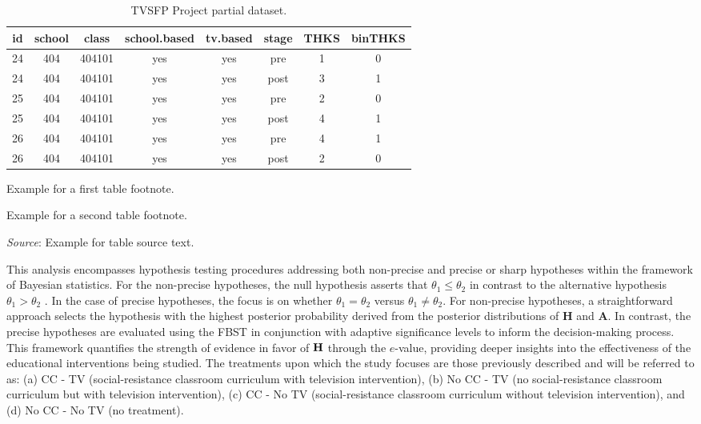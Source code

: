 \documentclass[AMA,Times1COL]{WileyNJDv5} %
\begin{document}
\begin{table}[!h]%
\centering %
\caption{TVSFP Project partial dataset.}\label{tab1}%
\begin{tabular*}{\textwidth}{@{\extracolsep\fill}cccccccc@{\extracolsep\fill}}
\toprule
\textbf{id}	&	\textbf{school}	&	\textbf{class}	&	\textbf{school.based}	&	\textbf{tv.based}	&	\textbf{stage}	&	\textbf{THKS}	&	\textbf{binTHKS}
\\ 
\midrule
24	&	404	&	404101	&	yes	&	yes	&	pre	&	1	&	0\\
24	&	404	&	404101	&	yes	&	yes	&	post	&	3	&	1\\
25	&	404	&	404101	&	yes	&	yes	&	pre	&	2	&	0\\
25	&	404	&	404101	&	yes	&	yes	&	post	&	4	&	1\\
26	&	404	&	404101	&	yes	&	yes	&	pre	&	4	&	1\\
26	&	404	&	404101	&	yes	&	yes	&	post	&	2	&	0\\
   \hline    
\bottomrule
\end{tabular*}
\begin{tablenotes}
\item[$^\dagger$] Example for a first table footnote.
\item[$^\ddagger$] Example for a second table footnote.
\item {\it Source}: Example for table source text.
\end{tablenotes}
\end{table}

This analysis encompasses hypothesis testing procedures addressing both non-precise and precise or sharp hypotheses within the framework of Bayesian statistics. For the non-precise hypotheses, the null hypothesis asserts that $\theta_1\leq \theta_2 $  in contrast to the alternative hypothesis $\theta_1>\theta_2$ . In the case of precise hypotheses, the focus is on whether $  \theta_1 = \theta_2$  versus $ \theta_1 \neq \theta_2 $. For non-precise hypotheses, a straightforward approach selects the hypothesis with the highest posterior probability derived from the posterior distributions of \textbf{H} and \textbf{A}. In contrast, the precise hypotheses are evaluated using the FBST in conjunction with adaptive significance levels to inform the decision-making process. This framework quantifies the strength of evidence in favor of $\text{\textbf{H}}$ through the $e$-value, providing deeper insights into the effectiveness of the educational interventions being studied. The treatments upon which the study focuses are those previously described and will be referred to as: (a) CC - TV (social-resistance classroom curriculum with television intervention), (b) No CC - TV (no social-resistance classroom curriculum but with television intervention), (c) CC - No TV (social-resistance classroom curriculum without television intervention), and (d) No CC - No TV (no treatment).
\end{document}
